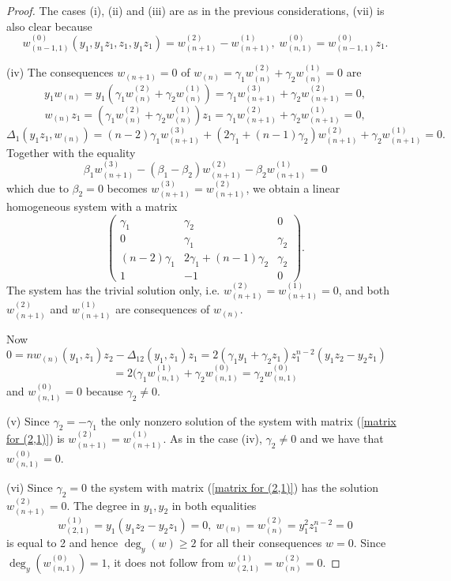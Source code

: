 \documentclass{amsart}
\theoremstyle{definition}
\begin{document}
\begin{proof}
The cases (i), (ii) and (iii) are as in the previous considerations, (vii) is also clear because
\[
w_{(n-1,1)}^{(0)}(y_1,y_1z_1,z_1,y_1z_1)=w_{(n+1)}^{(2)}-w_{(n+1)}^{(1)},\;w_{(n,1)}^{(0)}=w_{(n-1,1)}^{(0)}z_1.
\]

(iv) The consequences $w_{(n+1)}=0$ of $w_{(n)}=\gamma_1w_{(n)}^{(2)}+\gamma_2w_{(n)}^{(1)}=0$ are
\[
y_1w_{(n)}=y_1(\gamma_1w_{(n)}^{(2)}+\gamma_2w_{(n)}^{(1)})=\gamma_1w_{(n+1)}^{(3)}+\gamma_2w_{(n+1)}^{(2)}=0,
\]
\[
w_{(n)}z_1=(\gamma_1w_{(n)}^{(2)}+\gamma_2w_{(n)}^{(1)})z_1=\gamma_1w_{(n+1)}^{(2)}+\gamma_2w_{(n+1)}^{(1)}=0,
\]
\[
\Delta_1(y_1z_1,w_{(n)})=(n-2)\gamma_1w_{(n+1)}^{(3)}+(2\gamma_1+(n-1)\gamma_2)w_{(n+1)}^{(2)}+\gamma_2w_{(n+1)}^{(1)}=0.
\]
Together with the equality
\[
\beta_1w_{(n+1)}^{(3)}-(\beta_1-\beta_2)w_{(n+1)}^{(2)}-\beta_2w_{(n+1)}^{(1)}=0
\]
which due to $\beta_2=0$ becomes $w_{(n+1)}^{(3)}=w_{(n+1)}^{(2)}$, we obtain
a linear homogeneous system with a matrix
\begin{equation}\label{matrix for (2,1)}
\left(\begin{matrix}\gamma_1&\gamma_2&0\\
0&\gamma_1&\gamma_2\\
(n-2)\gamma_1&2\gamma_1+(n-1)\gamma_2&\gamma_2\\
1&-1&0
\end{matrix}\right).
\end{equation}
The system has the trivial solution only, i.e.
$w_{(n+1)}^{(2)}=w_{(n+1)}^{(1)}=0$,
and both $w_{(n+1)}^{(2)}$ and $w_{(n+1)}^{(1)}$ are consequences of $w_{(n)}$.

Now $0=nw_{(n)}(y_1,z_1)z_2-\Delta_{12}(y_1,z_1)z_1=2(\gamma_1y_1+\gamma_2z_1)z_1^{n-2}(y_1z_2-y_2z_1)$
\[
=2(\gamma_1w_{(n,1)}^{(1)}+\gamma_2w_{(n,1)}^{(0)}=\gamma_2w_{(n,1)}^{(0)}
\]
and $w_{(n,1)}^{(0)}=0$ because $\gamma_2\not=0$.

(v) Since $\gamma_2=-\gamma_1$ the only nonzero solution of the system with matrix (\ref{matrix for (2,1)}) is
$w_{(n+1)}^{(2)}=w_{(n+1)}^{(1)}$. As in the case (iv), $\gamma_2\not=0$ and we have that $w_{(n,1)}^{(0)}=0$.

(vi) Since $\gamma_2=0$ the system with matrix (\ref{matrix for (2,1)}) has the solution $w_{(n+1)}^{(2)}=0$.
The degree in $y_1,y_2$ in both equalities
\[
w_{(2,1)}^{(1)}=y_1(y_1z_2-y_2z_1)=0,\;w_{(n)}=w_{(n)}^{(2)}=y_1^2z_1^{n-2}=0
\]
is equal to 2 and hence $\deg_y(w)\geq 2$ for all their consequences $w=0$. Since $\deg_y(w_{(n,1)}^{(0)})=1$, it does not follow from
$w_{(2,1)}^{(1)}=w_{(n)}^{(2)}=0$.
\end{proof}
\end{document}

